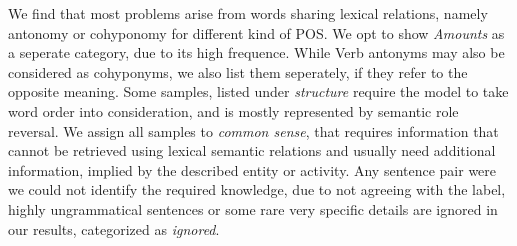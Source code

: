We find that most problems arise from words sharing lexical relations, namely antonomy or cohyponomy for different kind of \ac{POS}. We opt to show \textit{Amounts} as a seperate category, due to its high frequence. While Verb antonyms may also be considered as cohyponyms, we also list them seperately, if they refer to the opposite meaning. Some samples, listed under \textit{structure} require the model to take word order into consideration, and is mostly represented by semantic role reversal. We assign all samples to \textit{common sense}, that requires information that cannot be retrieved using lexical semantic relations and usually need additional information, implied by the described entity or activity. Any sentence pair were we could not identify the required knowledge, due to not agreeing with the label, highly ungrammatical  sentences or some rare very specific details are ignored in our results, categorized as \textit{ignored}.

